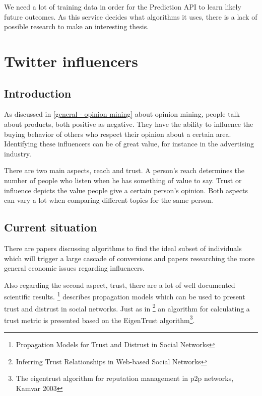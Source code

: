 We need a lot of training data in order for the Prediction API to learn likely future outcomes. As this service decides what algorithms it uses, there is a lack of possible research to make an interesting thesis.




\section{Twitter influencers}

\subsection{Introduction}
As discussed in \ref{general - opinion mining} about opinion mining, people talk about products, both positive as negative. They have the ability to influence the buying behavior of others who respect their opinion about a certain area. Identifying these influencers can be of great value, for instance in the advertising industry.

There are two main aspects, reach and trust. A person's reach determines the number of people who listen when he has something of value to say. Trust or influence depicts the value people give a certain person's opinion. Both aspects can vary a lot when comparing different topics for the same person.

\subsection{Current situation}

There are papers discussing algorithms to find the ideal subset of individuals which will trigger a large cascade of conversions and papers researching the more general economic issues regarding influencers.

Also regarding the second aspect, trust, there are a lot of well documented scientific results. \footnote{Propagation Models for Trust and Distrust in Social Networks} describes propagation models which can be used to present trust and distrust in social networks. Just as in \footnote{Inferring Trust Relationships in Web-based Social Networks} an algorithm for calculating a trust metric is presented based on the EigenTrust algorithm\footnote{The eigentrust algorithm for reputation management in p2p networks, Kamvar 2003}.

